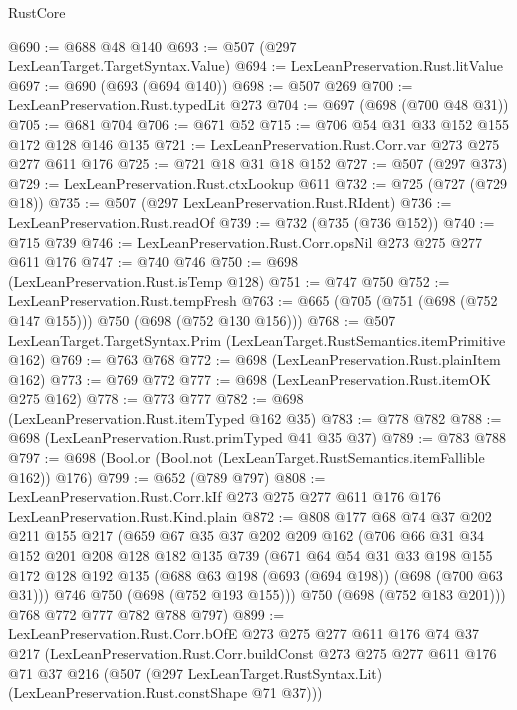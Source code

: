 \begin{lexlean}{RustCore}
\begin{coremodule}
@690 := @688 @48 @140
@693 := @507 (@297 LexLeanTarget.TargetSyntax.Value)
@694 := LexLeanPreservation.Rust.litValue
@697 := @690 (@693 (@694 @140))
@698 := @507 @269
@700 := LexLeanPreservation.Rust.typedLit @273
@704 := @697 (@698 (@700 @48 @31))
@705 := @681 @704
@706 := @671 @52
@715 := @706 @54 @31 @33 @152 @155 @172 @128 @146 @135
@721 := LexLeanPreservation.Rust.Corr.var @273 @275 @277 @611 @176
@725 := @721 @18 @31 @18 @152
@727 := @507 (@297 @373)
@729 := LexLeanPreservation.Rust.ctxLookup @611
@732 := @725 (@727 (@729 @18))
@735 := @507 (@297 LexLeanPreservation.Rust.RIdent)
@736 := LexLeanPreservation.Rust.readOf
@739 := @732 (@735 (@736 @152))
@740 := @715 @739
@746 := LexLeanPreservation.Rust.Corr.opsNil @273 @275 @277 @611 @176
@747 := @740 @746
@750 := @698 (LexLeanPreservation.Rust.isTemp @128)
@751 := @747 @750
@752 := LexLeanPreservation.Rust.tempFresh
@763 := @665 (@705 (@751 (@698 (@752 @147 @155))) @750 (@698 (@752 @130 @156)))
@768 := @507 LexLeanTarget.TargetSyntax.Prim (LexLeanTarget.RustSemantics.itemPrimitive @162)
@769 := @763 @768
@772 := @698 (LexLeanPreservation.Rust.plainItem @162)
@773 := @769 @772
@777 := @698 (LexLeanPreservation.Rust.itemOK @275 @162)
@778 := @773 @777
@782 := @698 (LexLeanPreservation.Rust.itemTyped @162 @35)
@783 := @778 @782
@788 := @698 (LexLeanPreservation.Rust.primTyped @41 @35 @37)
@789 := @783 @788
@797 := @698 (Bool.or (Bool.not (LexLeanTarget.RustSemantics.itemFallible @162)) @176)
@799 := @652 (@789 @797)
@808 := LexLeanPreservation.Rust.Corr.kIf
    @273
    @275
    @277
    @611
    @176
    @176
    LexLeanPreservation.Rust.Kind.plain
@872 := @808
    @177
    @68
    @74
    @37
    @202
    @211
    @155
    @217
    (@659
      @67
      @35
      @37
      @202
      @209
      @162
      (@706
        @66
        @31
        @34
        @152
        @201
        @208
        @128
        @182
        @135
        @739
        (@671
          @64
          @54
          @31
          @33
          @198
          @155
          @172
          @128
          @192
          @135
          (@688 @63 @198 (@693 (@694 @198)) (@698 (@700 @63 @31)))
          @746
          @750
          (@698 (@752 @193 @155)))
        @750
        (@698 (@752 @183 @201)))
      @768
      @772
      @777
      @782
      @788
      @797)
@899 := LexLeanPreservation.Rust.Corr.bOfE
    @273
    @275
    @277
    @611
    @176
    @74
    @37
    @217
    (LexLeanPreservation.Rust.Corr.buildConst
      @273
      @275
      @277
      @611
      @176
      @71
      @37
      @216
      (@507 (@297 LexLeanTarget.RustSyntax.Lit) (LexLeanPreservation.Rust.constShape @71 @37)))

\end{coremodule}
\end{lexlean}

